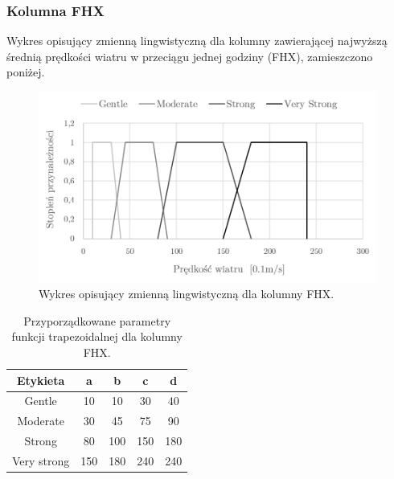 \documentclass{classrep}
\begin{document}
\subsubsection{Kolumna FHX}
Wykres opisujący zmienną lingwistyczną dla kolumny zawierającej najwyższą średnią prędkości wiatru w przeciągu jednej godziny (FHX), zamieszczono poniżej.
\begin{figure}[H]
	\centering
	\includegraphics[width=0.99\textwidth]{Pictures/TermsCharts/FHX.png}
	\caption{Wykres opisujący zmienną lingwistyczną dla kolumny FHX.}
\end{figure}

\begin{table}[H]
	\centering
	\begin{tabular}{c c c c c} 
		\hline
		\textbf{Etykieta} & \textbf{a} & \textbf{b} & \textbf{c} & \textbf{d}\\ [0.5ex] 
		\hline
		\hline 
Gentle	 & 10 & 10 & 30 & 40 \\
Moderate & 30 & 45 & 75 & 90 \\
Strong	 & 80 & 100 & 150 & 180 \\
Very strong & 150 & 180 & 240 & 240 \\
		\hline
	\end{tabular}
	\caption{Przyporządkowane parametry funkcji trapezoidalnej dla kolumny FHX.}
\end{table}

\clearpage
\end{document}
